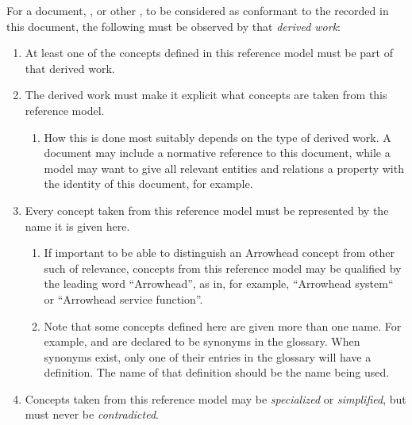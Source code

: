 %
%

For a document, , or other , to be considered as conformant to the  recorded in this document, the following must be observed by that \textit{derived work}:

\begin{enumerate}
\item At least one of the concepts defined in this reference model must be part of that derived work.
\item The derived work must make it explicit what concepts are taken from this reference model.
	\begin{enumerate}
	\item How this is done most suitably depends on the type of derived work. A document may include a normative reference to this document, while a model may want to give all relevant entities and relations a property with the identity of this document, for example.
	\end{enumerate}
\item Every concept taken from this reference model must be represented by the name it is given here.
	\begin{enumerate}
	\item If important to be able to distinguish an Arrowhead concept from other such of relevance, concepts from this reference model may be qualified by the leading word ``Arrowhead'', as in, for example, ``Arrowhead system`` or ``Arrowhead service function''.
	\item Note that some concepts defined here are given more than one name. For example,  and  are declared to be synonyms in the glossary. When synonyms exist, only one of their entries in the glossary will have a definition. The name of that definition should be the name being used.
	\end{enumerate}
\item Concepts taken from this reference model may be \textit{specialized} or \textit{simplified}, but must never be \textit{contradicted}.
	\begin{enumerate}

\end{enumerate}
\end{enumerate}

